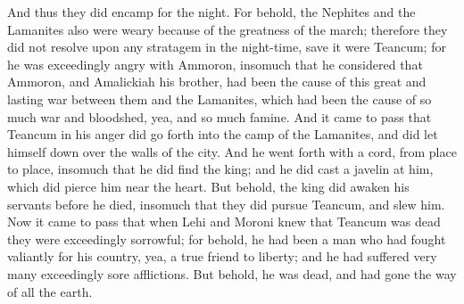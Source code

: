 \bverse \iffalse And thus they did encamp for the night. For behold, the Nephites and the Lamanites also were weary because of the greatness of the march; therefore they did not resolve upon any stratagem in the night-time, save it were Teancum; for he was exceedingly angry with Ammoron, insomuch that he considered that Ammoron, and Amalickiah his brother, had been the cause of this great and lasting war between them and the Lamanites, which had been the cause of so much war and bloodshed, yea, and so much famine. \fi
And thus they did encamp for the night. For behold, the Nephites and the Lamanites also were weary because of the greatness of the march; therefore they did not resolve upon any stratagem in the night-time, save it were Teancum; for he was exceedingly angry with Ammoron, insomuch that he considered that Ammoron, and Amalickiah his brother, had been the cause of this great and lasting war between them and the Lamanites, which had been the cause of so much war and bloodshed, yea, and so much famine.
\bverse \iffalse And it came to pass that Teancum in his anger did go forth into the camp of the Lamanites, and did let himself down over the walls of the city. And he went forth with a cord, from place to place, insomuch that he did find the king; and he did cast a javelin at him, which did pierce him near the heart. But behold, the king did awaken his servants before he died, insomuch that they did pursue Teancum, and slew him. \fi
And it came to pass that Teancum in his anger did go forth into the camp of the Lamanites, and did let himself down over the walls of the city. And he went forth with a cord, from place to place, insomuch that he did find the king; and he did cast a javelin at him, which did pierce him near the heart. But behold, the king did awaken his servants before he died, insomuch that they did pursue Teancum, and slew him.
\bverse \iffalse Now it came to pass that when Lehi and Moroni knew that Teancum was dead they were exceedingly sorrowful; for behold, he had been a man who had fought valiantly for his country, yea, a true friend to liberty; and he had suffered very many exceedingly sore afflictions. But behold, he was dead, and had gone the way of all the earth. \fi
Now it came to pass that when Lehi and Moroni knew that Teancum was dead they were exceedingly sorrowful; for behold, he had been a man who had fought valiantly for his country, yea, a true friend to liberty; and he had suffered very many exceedingly sore afflictions. But behold, he was dead, and had gone the way of all the earth.
